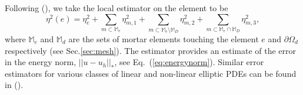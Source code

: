 %
Following (\cite{bi2015posteriori}), we take the local estimator on the element to be
%
\begin{equation}
\label{eq:Eta2_Local}
\eta^2(e) =\eta^{2}_{e} + \sum_{m \subset \mathbb{M}_e}\eta^{2}_{m,1} + \sum_{m \subset \mathbb{M}_e\setminus \mathbb{M}_D}\eta^{2}_{m,2} + \sum_{m \subset \mathbb{M}_e \cap \mathbb{M}_D}\eta^{2}_{m,3},
\end{equation}
%
where $\mathbb{M}_e$ and $\mathbb{M}_d$ are the sets of mortar elements touching the element $e$ and  $\partial \Omega_d$ respectively (see Sec.\ref{sec:mesh}). %
The estimator provides an estimate of the error in the energy norm, $ || u - u_h ||_* $, see Eq.~(\ref{eq:energynorm}).  Similar error estimators for various classes of linear and non-linear elliptic PDEs can be found in (\cite{houstonschotzau05,hansbo2011energy,zhu2011energy,houston2007energy,schotzau.d;zhu.l2009,houstonperugia05,lovadina.c;marini.l2009}).
